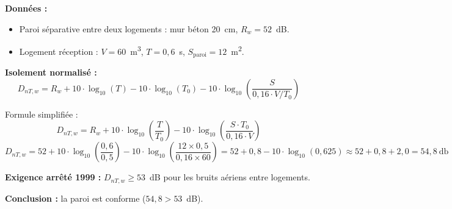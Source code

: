 \begin{exemple}[title={Vérification réglementaire isolement logement}]
\textbf{Données :}
\begin{itemize}
  \item Paroi séparative entre deux logements : mur béton 20~cm, $R_w = 52$~dB.
  \item Logement réception : $V = 60$~\si{\metre\cubed}, $T = 0{,}6$~\si{\second}, $S_{\text{paroi}} = 12$~\si{\metre\squared}.
\end{itemize}

\textbf{Isolement normalisé :}
\[
  D_{nT,w} = R_w + 10 \cdot \log_{10}(T) - 10 \cdot \log_{10}(T_0) - 10 \cdot \log_{10}\!\left(\frac{S}{0{,}16 \cdot V / T_0}\right)
\]

Formule simplifiée :
\[
  D_{nT,w} = R_w + 10 \cdot \log_{10}\!\left(\frac{T}{T_0}\right) - 10 \cdot \log_{10}\!\left(\frac{S \cdot T_0}{0{,}16 \cdot V}\right)
\]
\[
  D_{nT,w} = 52 + 10 \cdot \log_{10}\!\left(\frac{0{,}6}{0{,}5}\right) - 10 \cdot \log_{10}\!\left(\frac{12 \times 0{,}5}{0{,}16 \times 60}\right)
  = 52 + 0{,}8 - 10 \cdot \log_{10}(0{,}625)
  \approx 52 + 0{,}8 + 2{,}0 = 54{,}8~\si{\decibel}
\]

\textbf{Exigence arrêté 1999 :} $D_{nT,w} \geq 53$~dB pour les bruits aériens entre logements.

\textbf{Conclusion :} la paroi est conforme ($54{,}8 > 53$~dB).
\end{exemple}

